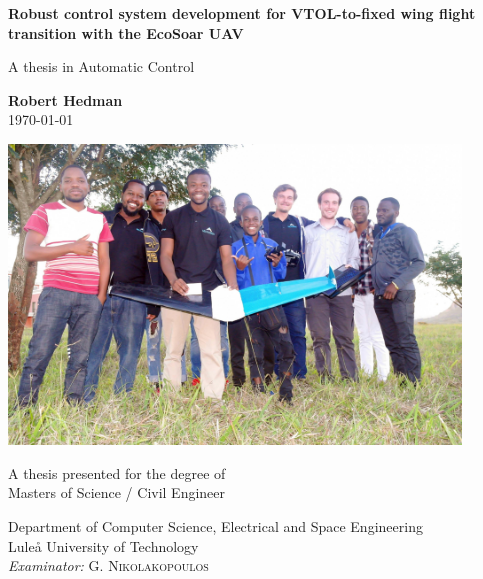 \documentclass{article}
\begin{document}
\begin{titlepage}
    \begin{center}
 
        \huge
        \textbf{Robust control system development for VTOL-to-fixed wing flight transition with the EcoSoar UAV}
 
        \vspace{0.5cm}
        \LARGE
        A thesis in Automatic Control
 
        \vspace{1.5cm}
 
        \textbf{Robert Hedman\\}
        \today
        \vspace{0.6cm}

        \includegraphics[width=0.9\textwidth]{coverphoto.jpeg}
 
        \vfill
 
        A thesis presented for the degree of\\
        Masters of Science / Civil Engineer
 
        \vspace{0.6cm}
 
        \Large
        Department of Computer Science, Electrical and Space Engineering\\
        Luleå University of Technology\\
        \textit{Examinator:} G. \textsc{Nikolakopoulos}

 
    \end{center}
\end{titlepage}
\end{document}
